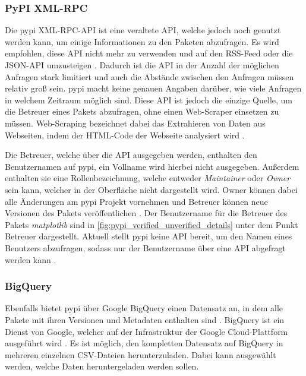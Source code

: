 \subsubsection*{PyPI XML-RPC}
\label{subsubsec:pypi_xml_rpc}
Die \gls{pypi} XML-RPC-API ist eine veraltete API, welche jedoch noch genutzt werden kann, um einige Informationen zu den Paketen abzufragen.
Es wird empfohlen, diese API nicht mehr zu verwenden und auf den RSS-Feed oder die JSON-API umzusteigen \autocite{python_software_foundation_warehouse_2024}.
Dadurch ist die API in der Anzahl der möglichen Anfragen stark limitiert und auch die Abstände zwischen den Anfragen müssen relativ groß sein.
\gls{pypi} macht keine genauen Angaben darüber, wie viele Anfragen in welchem Zeitraum möglich sind.
Diese API ist jedoch die einzige Quelle, um die Betreuer eines Pakets abzufragen, ohne einen Web-Scraper einsetzen zu müssen.
Web-Scraping bezeichnet dabei das Extrahieren von Daten aus Webseiten, indem der HTML-Code der Webseite analysiert wird \autocite{richardson_beautifulsoup4_2024}.

Die Betreuer, welche über die API ausgegeben werden, enthalten den Benutzernamen auf \gls{pypi}, ein Vollname wird hierbei nicht ausgegeben.
Außerdem enthalten sie eine Rollenbezeichnung, welche entweder \emph{Maintainer} oder \emph{Owner} sein kann, welcher in der Oberfläche nicht dargestellt wird.
Owner können dabei alle Änderungen am \gls{pypi} Projekt vornehmen und Betreuer können neue Versionen des Pakets veröffentlichen \autocite{ingram_deprecate_2023}.
Der Benutzername für die Betreuer des Pakets \emph{matplotlib} sind in \autoref{fig:pypi_verified_unverified_details} unter dem Punkt \glqq Betreuer\grqq{} dargestellt.
Aktuell stellt \gls{pypi} keine API bereit, um den Namen eines Benutzers abzufragen, sodass nur der Benutzername über eine API abgefragt werden kann \autocite{python_software_foundation_add_2024}.

\subsubsection*{BigQuery}
\label{subsubsec:pypi_bigquery}
Ebenfalls bietet \gls{pypi} über Google BigQuery einen Datensatz an, in dem alle Pakete mit ihren Versionen und Metadaten enthalten sind \autocite{python_software_foundation_warehouse_2024}.
BigQuery ist ein Dienst von Google, welcher auf der Infrastruktur der Google Cloud-Plattform ausgeführt wird \autocite{google_bigquery_2024}.
Es ist möglich, den kompletten Datensatz auf BigQuery in mehreren einzelnen CSV-Dateien herunterzuladen.
Dabei kann ausgewählt werden, welche Daten heruntergeladen werden sollen.

